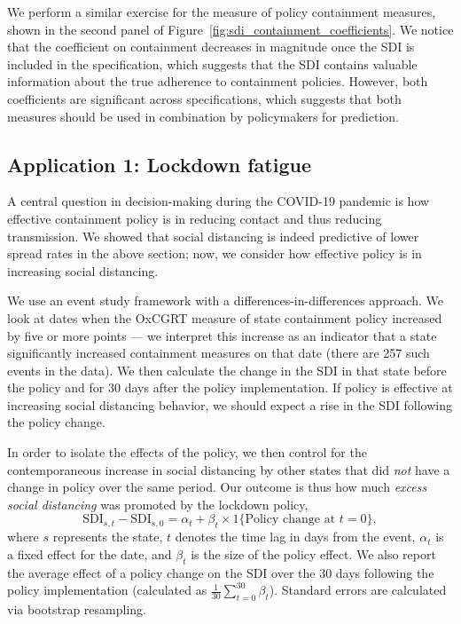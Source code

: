 \documentclass[dvipsnames]{article}
\begin{document}
We perform a similar exercise for the measure of policy containment measures, shown in the second panel of Figure~\ref{fig:sdi_containment_coefficients}. We notice that the coefficient on containment decreases in magnitude once the SDI is included in the specification, which suggests that the SDI contains valuable information about the true adherence to containment policies. However, both coefficients are significant across specifications, which suggests that both measures should be used in combination by policymakers for prediction.

\subsection{Application 1: Lockdown fatigue}
\label{subsec:fatigue}

A central question in decision-making during the COVID-19 pandemic is how effective containment policy is in reducing contact and thus reducing transmission. We showed that social distancing is indeed predictive of lower spread rates in the above section; now, we consider how effective policy is in increasing social distancing.

We use an event study framework with a differences-in-differences approach. We look at dates when the OxCGRT measure of state containment policy increased by five or more points --- we interpret this increase as an indicator that a state significantly increased containment measures on that date (there are 257 such events in the data). We then calculate the change in the SDI in that state before the policy and for 30 days after the policy implementation. If policy is effective at increasing social distancing behavior, we should expect a rise in the SDI following the policy change.

In order to isolate the effects of the policy, we then control for the contemporaneous increase in social distancing by other states that did \textit{not} have a change in policy over the same period. Our outcome is thus how much \textit{excess social distancing} was promoted by the lockdown policy,
\[ \text{SDI}_{s,t} - \text{SDI}_{s,0} = \alpha_t + \beta_t \times 1\{ \text{Policy change at $t=0$} \},  \]
where $s$ represents the state, $t$ denotes the time lag in days from the event, $\alpha_t$ is a fixed effect for the date, and $\beta_t$ is the size of the policy effect. We also report the average effect of a policy change on the SDI over the 30 days following the policy implementation (calculated as $\frac{1}{30} \sum_{t=0}^{30} \beta_t$). Standard errors are calculated via bootstrap resampling.
\end{document}
